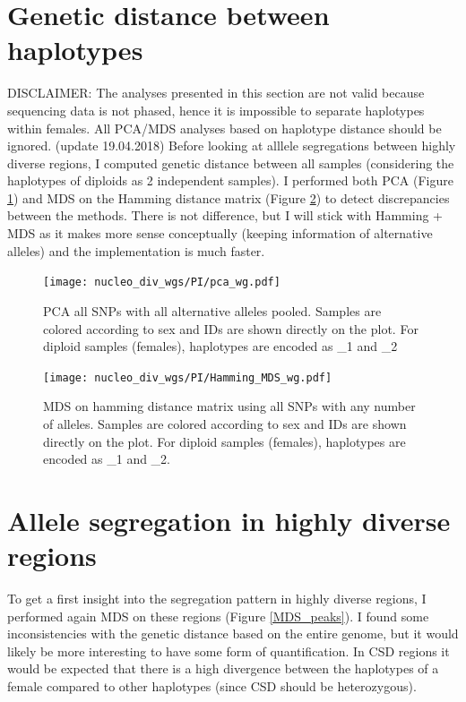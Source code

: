 \documentclass[10pt,a4paper]{report}
\begin{document}
\section{Genetic distance between haplotypes}
DISCLAIMER: The analyses presented in this section are not valid because sequencing data is not phased, hence it is impossible to separate haplotypes within females. All PCA/MDS analyses based on haplotype distance should be ignored. (update 19.04.2018)
Before looking at alllele segregations between highly diverse regions, I computed genetic distance between all samples (considering the haplotypes of diploids as 2 independent samples). I performed both PCA (Figure \ref{PCA_wg}) and MDS on the Hamming distance matrix (Figure \ref{MDS_wg}) to detect discrepancies between the methods. There is not difference, but I will stick with Hamming + MDS as it makes more sense conceptually (keeping information of alternative alleles) and the implementation is much faster.

\begin{figure}
\texttt{[image: nucleo\_div\_wgs/PI/pca\_wg.pdf]}
\caption{PCA all SNPs with all alternative alleles pooled. Samples are colored according to sex and IDs are shown directly on the plot. For diploid samples (females), haplotypes are encoded as \_1 and \_2}
\label{PCA_wg}
\end{figure}

\begin{figure}
\texttt{[image: nucleo\_div\_wgs/PI/Hamming\_MDS\_wg.pdf]}
\caption{MDS on hamming distance matrix using all SNPs with any number of alleles. Samples are colored according to sex and IDs are shown directly on the plot. For diploid samples (females), haplotypes are encoded as \_1 and \_2.}
\label{MDS_wg}
\end{figure}

\section{Allele segregation in highly diverse regions}
To get a first insight into the segregation pattern in highly diverse regions, I performed again MDS on these regions (Figure \ref{MDS_peaks}). I found some inconsistencies with the genetic distance based on the entire genome, but it would likely be more interesting to have some form of quantification. In CSD regions it would be expected that there is a high divergence between the haplotypes of a female compared to other haplotypes (since CSD should be heterozygous).
\end{document}

